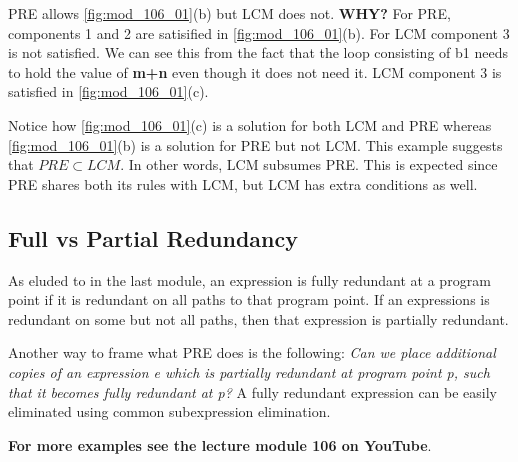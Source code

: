 PRE allows \ref{fig:mod_106_01}(b) but LCM does not. \textbf{WHY?} For PRE, components 1 and 2 are satisified in \ref{fig:mod_106_01}(b). For LCM component 3 is not satisfied. We can see this from the fact that the loop consisting of b1 needs to hold the value of \textbf{m+n} even though it does not need it. LCM component 3 is satisfied in \ref{fig:mod_106_01}(c).

Notice how \ref{fig:mod_106_01}(c) is a solution for both LCM and PRE whereas \ref{fig:mod_106_01}(b) is a solution for PRE but not LCM. This example suggests that $PRE \subset LCM$. In other words, LCM subsumes PRE. This is expected since PRE shares both its rules with LCM, but LCM has extra conditions as well.

\subsection{Full vs Partial Redundancy}

As eluded to in the last module, an expression is fully redundant at a program point if it is redundant on all paths to that program point. If an expressions is redundant on some but not all paths, then that expression is partially redundant.

Another way to frame what PRE does is the following: \textit{Can we place additional copies of an expression e which is partially redundant at program point p, such that it becomes fully redundant at p?} A fully redundant expression can be easily eliminated using common subexpression elimination.


\textbf{For more examples see the lecture module 106 on YouTube}.



